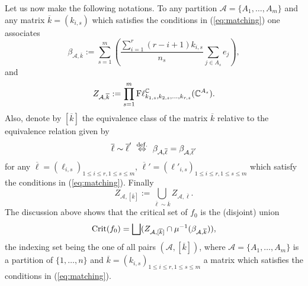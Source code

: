 \documentclass[12pt]{amsart}
\theoremstyle{definition}
\theoremstyle{remark}
\newcommand{\CC}{\mathbb C}
\newcommand{\vk}{\overline{k}}
\newcommand{\A}{{\mathcal A}}
\begin{document}
Let us now make the following notations. To any partition ${\mathcal A}=\{A_1, \ldots, A_m\}$ and any matrix
$\overline{k}=(k_{i,s})$  which satisfies  the conditions in (\ref{eq:matching}) one associates 
$$\beta_{{\mathcal A},\overline{k}} := \sum_{s=1}^m\left(\frac{\sum_{i=1}^r(r-i+1) k_{i, s}}{n_s}\sum_{j\in A_s} e_j \right),$$
 and
 \begin{equation}\label{zak}Z_{{\A,\overline{k}}}:=  \prod_{s=1}^m {\rm F}\ell^\CC_{k_{1,s}, k_{2,s}, \ldots, k_{r,s}}(\CC^{A_s}).\end{equation}
 Also, denote by $[\overline{k}]$ the equivalence class of the matrix $\overline{k}$ relative to the equivalence relation given by
\begin{equation}\label{sime}{\overline{\ell}} \sim \overline{\ell}' \ \stackrel{{\rm def.}}{\Leftrightarrow}  \ \beta_{\A,\overline{\ell}}=\beta_{\A, \overline{\ell}'}\end{equation}
 for any $\overline{\ell}=(\ell_{i,s})_{1\le i \le r, 1\le s\le m}$, $\overline{\ell}'=(\ell'_{i,s})_{1\le i \le r, 1\le s\le m}$ which satisfy the conditions in (\ref{eq:matching}). Finally
\begin{equation}\label{za}Z_{{\A,[\overline{k}]}}:=\bigcup_{\overline{\ell} \sim \overline{k}} Z_{{\A,\overline{\ell}}}.\end{equation}
The discussion above shows that the critical set of $f_0$ is the (disjoint) union 
$${\rm Crit}(f_0)= \bigsqcup (Z_{{\A,[\overline{k}]}} \cap \mu^{-1}(\beta_{\A,\overline{k}})),$$
the indexing set being the one of all pairs $(\A, [\vk])$, where ${\mathcal A}=\{A_1, \ldots, A_m\}$ is a partition of 
 $\{1, \ldots,n\}$ and $\overline{k}=(k_{i,s})_{1\le i \le r, 1\le s\le m}$ a matrix which satisfies  the conditions in (\ref{eq:matching}).
 
\end{document}
